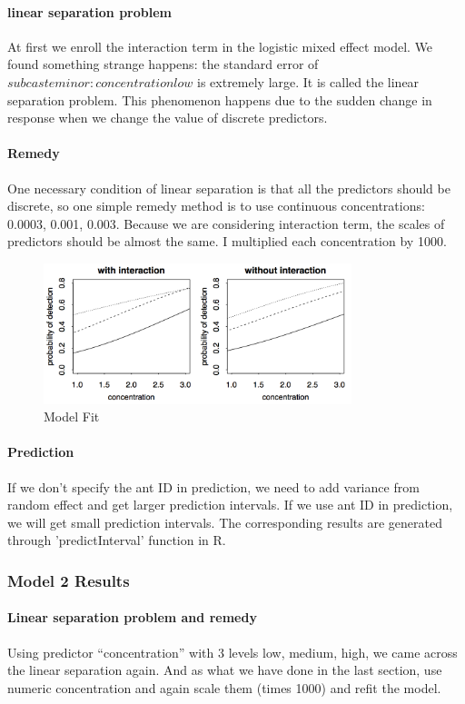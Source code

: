 \documentclass{article}
\begin{document}
	\paragraph{linear separation problem}
	At first we enroll the interaction term in the logistic mixed effect model. We found something strange happens: the standard error of $subcasteminor:concentrationlow$ is extremely large. It is called the linear separation problem. This phenomenon happens due to the sudden change in response when we change the value of discrete predictors. 
	
	\paragraph{Remedy}One necessary condition of linear separation is that all the predictors should be discrete, so one simple remedy method is to use continuous concentrations: 0.0003, 0.001, 0.003. Because we are considering interaction term, the scales of predictors should be almost the same. I multiplied each concentration by 1000.
		
	\begin{figure}[h]
		\centering
		\includegraphics[width=0.8\textwidth]{AntModel1plot}
		\caption{Model Fit}
	\end{figure}
	
	\paragraph{Prediction}
	If we don’t specify the ant ID in prediction, we need to add variance from random effect and get larger prediction intervals. If we use ant ID in prediction, we will get small prediction intervals. The corresponding results are generated through 'predictInterval' function in R.
	\subsubsection{Model 2 Results}
	\paragraph{Linear separation problem and remedy}
	Using predictor “concentration” with 3 levels low, medium, high, we came across the linear separation again. And as what we have done in the last section, use numeric concentration and again scale them (times 1000) and refit the model.
	
\end{document}
